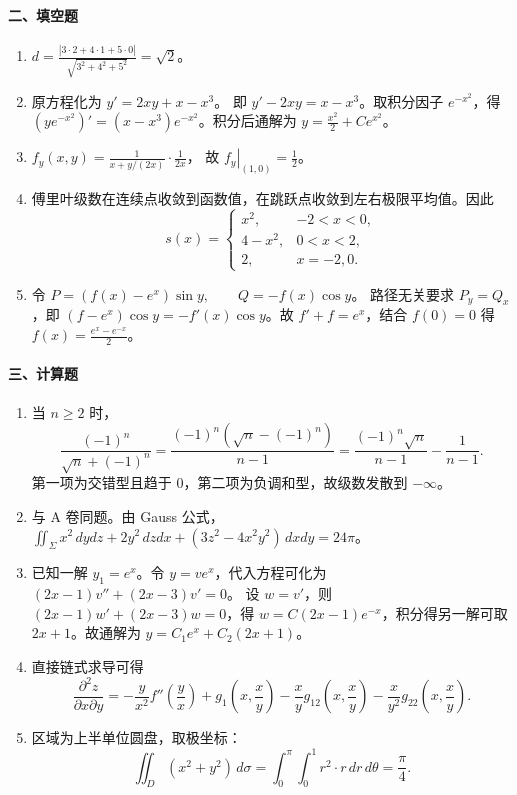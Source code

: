 \paragraph*{二、填空题}
\begin{enumerate}
  \item \(\displaystyle d=\frac{|3\cdot2+4\cdot1+5\cdot0|}{\sqrt{3^2+4^2+5^2}}=\sqrt2\)。
  \item 原方程化为
  \(\displaystyle y'=2xy+x-x^3\)。
  即 \(\displaystyle y'-2xy=x-x^3\)。取积分因子 $e^{-x^2}$，得
  \(\displaystyle (ye^{-x^2})'=(x-x^3)e^{-x^2}\)。积分后通解为
  \(\displaystyle y=\frac{x^2}{2}+Ce^{x^2}\)。
  \item \(\displaystyle f_y(x,y)=\frac{1}{x+y/(2x)}\cdot\frac1{2x}\)，
  故
  \(\displaystyle \left.f_y\right|_{(1,0)}=\frac12\)。
  \item 傅里叶级数在连续点收敛到函数值，在跳跃点收敛到左右极限平均值。因此
  \[
  s(x)=
  \begin{cases}
  x^2,&-2<x<0,\\
  4-x^2,&0<x<2,\\
  2,&x=-2,0.
  \end{cases}
  \]
  \item 令 \(\displaystyle P=(f(x)-e^x)\sin y,\qquad Q=-f(x)\cos y\)。
  路径无关要求 $P_y=Q_x$，即
  \(\displaystyle (f-e^x)\cos y=-f'(x)\cos y\)。故 $f'+f=e^x$，结合 $f(0)=0$ 得
  \(\displaystyle f(x)=\frac{e^x-e^{-x}}2\)。
\end{enumerate}

\paragraph*{三、计算题}
\begin{enumerate}
  \item 当 $n\ge2$ 时，
  \[
  \frac{(-1)^n}{\sqrt n+(-1)^n}
  =
  \frac{(-1)^n(\sqrt n-(-1)^n)}{n-1}
  =
  \frac{(-1)^n\sqrt n}{n-1}-\frac1{n-1}.
  \]
  第一项为交错型且趋于 $0$，第二项为负调和型，故级数发散到 $-\infty$。
  \item 与 A 卷同题。由 Gauss 公式，
  \(\displaystyle \iint_{\Sigma}x^2\,dydz+2y^2\,dzdx+(3z^2-4x^2y^2)\,dxdy=24\pi\)。
  \item 已知一解 $y_1=e^x$。令 $y=ve^x$，代入方程可化为
  \(\displaystyle (2x-1)v''+(2x-3)v'=0\)。
  设 $w=v'$，则
  \(\displaystyle (2x-1)w'+(2x-3)w=0\)，得 $w=C(2x-1)e^{-x}$，积分得另一解可取 $2x+1$。故通解为
  \(\displaystyle y=C_1e^x+C_2(2x+1)\)。
  \item 直接链式求导可得
  \[
  \frac{\partial^2z}{\partial x\partial y}
  =-\frac{y}{x^2}f''\left(\frac yx\right)
  +g_1\left(x,\frac xy\right)
  -\frac{x}{y}g_{12}\left(x,\frac xy\right)
  -\frac{x}{y^2}g_{22}\left(x,\frac xy\right).
  \]
  \item 区域为上半单位圆盘，取极坐标：
  \[
  \iint_D(x^2+y^2)\,d\sigma
  =\int_0^\pi\int_0^1 r^2\cdot r\,dr\,d\theta
  =\frac{\pi}{4}.
  \]
\end{enumerate}

